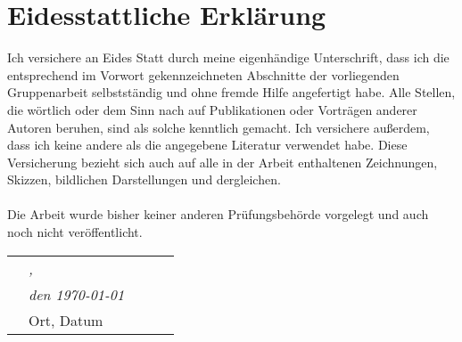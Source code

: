 \chapter*{Eidesstattliche Erklärung}
Ich versichere an Eides Statt durch meine eigenhändige Unterschrift, dass ich die entsprechend im Vorwort gekennzeichneten Abschnitte der vorliegenden Gruppenarbeit selbstständig und ohne fremde Hilfe angefertigt habe. Alle Stellen, die wörtlich oder dem Sinn nach auf Publikationen oder
Vorträgen anderer Autoren beruhen, sind als solche kenntlich gemacht.
Ich versichere außerdem, dass ich keine andere als die angegebene
Literatur verwendet habe. Diese Versicherung bezieht sich auch auf alle in
der Arbeit enthaltenen Zeichnungen, Skizzen, bildlichen Darstellungen und
dergleichen.
\\
\\
Die Arbeit wurde bisher keiner anderen Prüfungsbehörde vorgelegt und
auch noch nicht veröffentlicht.
\vspace{3cm}

\centering
\begin{tabular}{p{10mm}>{\centering\arraybackslash}p{50mm}p{10mm}
		>{\centering\arraybackslash}p{50mm}p{10mm}}
	&\textit{\large \TOWN,}&&& \\
	&\textit{\large den \today}&&\hrulefill& \\
	&\small Ort, Datum&&\small \AUTHOR&
\end{tabular}